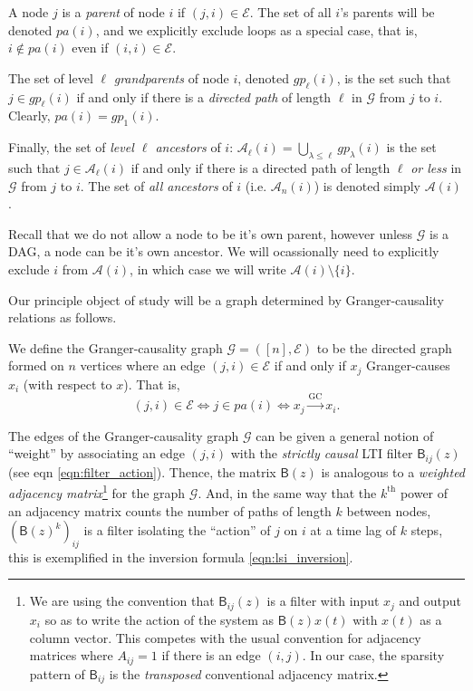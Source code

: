 \documentclass[12pt]{article}
\def\gc{\overset{\text{GC}}{\rightarrow}}  %
\def\gcg{\mathcal{G}}  %
\def\gcge{\mathcal{E}}  %
\def\B{\mathsf{B}}  %
\newcommand{\pa}[1]{pa(#1)}  %
\newcommand{\anc}[1]{\mathcal{A}(#1)}  %
\newcommand{\ancn}[2]{\mathcal{A}_{#1}(#2)}  %
\newcommand{\gpn}[2]{gp_{#1}(#2)}  %
\begin{document}
\begin{definition}
  A node $j$ is a \textit{parent} of node $i$ if $(j, i) \in \gcge$.
  The set of all $i$'s parents will be denoted $\pa{i}$, and we
  explicitly exclude loops as a special case, that is,
  $i \not\in \pa{i}$ even if $(i, i) \in \gcge$.

  The set of level $\ell$ \textit{grandparents} of node $i$, denoted
  $\gpn{\ell}{i}$, is the set such that $j \in \gpn{\ell}{i}$ if and
  only if there is a \textit{directed path} of length $\ell$ in $\gcg$
  from $j$ to $i$.  Clearly, $\pa{i} = \gpn{1}{i}$.

  Finally, the set of \textit{level $\ell$ ancestors} of $i$:
  $\ancn{\ell}{i} = \bigcup_{\lambda \le \ell}\gpn{\lambda}{i}$ is the
  set such that $j \in \ancn{\ell}{i}$ if and only if there is a
  directed path of length $\ell$ \textit{or less} in $\gcg$ from $j$
  to $i$.  The set of \textit{all ancestors} of $i$
  (i.e. $\ancn{n}{i}$) is denoted simply $\anc{i}$.

  Recall that we do not allow a node to be it's own parent, however
  unless $\gcg$ is a DAG, a node can be it's own ancestor.  We will
  ocassionally need to explicitly exclude $i$ from $\anc{i}$, in which
  case we will write $\anc{i}\setminus \{i\}$.
\end{definition}

Our principle object of study will be a graph determined by
Granger-causality relations as follows.

\begin{definition}
  We define the Granger-causality graph $\gcg = ([n], \gcge)$ to be the directed
  graph formed on $n$ vertices where an edge $(j, i) \in \gcge$ if and
  only if $x_j$ Granger-causes $x_i$ (with respect to $x$).  That is,
  $$(j, i) \in \gcge \iff j \in \pa{i} \iff x_j \gc x_i.$$
\end{definition}

The edges of the Granger-causality graph $\gcg$ can be given a general
notion of ``weight'' by associating an edge $(j, i)$ with the
\textit{strictly causal} LTI filter $\B_{ij}(z)$ (see eqn
\eqref{eqn:filter_action}).  Thence, the matrix $\B(z)$ is analogous
to a \textit{weighted adjacency matrix}\footnote{We are using the
  convention that $\B_{ij}(z)$ is a filter with input $x_j$ and output
  $x_i$ so as to write the action of the system as $\B(z)x(t)$ with
  $x(t)$ as a column vector.  This competes with the usual convention
  for adjacency matrices where $A_{ij} = 1$ if there is an edge
  $(i, j)$.  In our case, the sparsity pattern of $\B_{ij}$ is the
  \textit{transposed} conventional adjacency matrix.} for the graph $\gcg$.  And,
in the same way that the $k^{\text{th}}$ power of an adjacency matrix
counts the number of paths of length $k$ between nodes,
$(\B(z)^k)_{ij}$ is a filter isolating the ``action'' of $j$ on $i$ at
a time lag of $k$ steps, this is exemplified in the inversion formula
\ref{eqn:lsi_inversion}.
\end{document}
